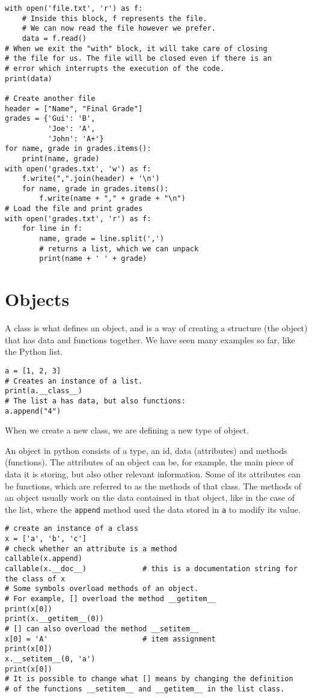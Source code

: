 \documentclass[12pt, a4paper]{article}
\begin{document}
\begin{lstlisting}
with open('file.txt', 'r') as f:
    # Inside this block, f represents the file.
    # We can now read the file however we prefer.
    data = f.read()
# When we exit the "with" block, it will take care of closing
# the file for us. The file will be closed even if there is an
# error which interrupts the execution of the code.
print(data)

# Create another file
header = ["Name", "Final Grade"]
grades = {'Gui': 'B',
          'Joe': 'A',
          'John': 'A+'}
for name, grade in grades.items():
    print(name, grade)
with open('grades.txt', 'w') as f:
    f.write(",".join(header) + '\n')
    for name, grade in grades.items():
        f.write(name + "," + grade + "\n")
# Load the file and print grades
with open('grades.txt', 'r') as f:
    for line in f:
        name, grade = line.split(',')
        # returns a list, which we can unpack
        print(name + ' ' + grade)
\end{lstlisting}
\section{Objects}
\label{sec:orgc7dec81}
A class is what defines an object, and is a way of creating a structure (the object) that has data and functions together.
We have seen many examples so far, like the Python list.
\lstset{language=jupyter-python,label= ,caption= ,captionpos=b,numbers=none}
\begin{lstlisting}
a = [1, 2, 3]
# Creates an instance of a list.
print(a.__class__)
# The list a has data, but also functions:
a.append("4")
\end{lstlisting}
When we create a new class, we are defining a new type of object.

An object in python consists of a type, an id, data (attributes) and methods (functions).
The attributes of an object can be, for example, the main piece of data it is storing, but also other relevant information.
Some of its attributes can be functions, which are referred to as the methods of that class.
The methods of an object usually work on the data contained in that object, like in the case of the list, where the \texttt{append} method used the data stored in \texttt{a} to modify its value.

\lstset{language=jupyter-python,label= ,caption= ,captionpos=b,numbers=none}
\begin{lstlisting}
# create an instance of a class
x = ['a', 'b', 'c']
# check whether an attribute is a method
callable(x.append)
callable(x.__doc__)             # this is a documentation string for the class of x
# Some symbols overload methods of an object.
# For example, [] overload the method __getitem__
print(x[0])
print(x.__getitem__(0))
# [] can also overload the method __setitem__
x[0] = 'A'                      # item assignment
print(x[0])
x.__setitem__(0, 'a')
print(x[0])
# It is possible to change what [] means by changing the definition
# of the functions __setitem__ and __getitem__ in the list class.
\end{lstlisting}
\end{document}
